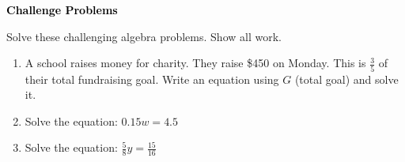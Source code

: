\documentclass[12pt, letterpaper, fleqn]{article}
\begin{document}
\newpage

\begin{tcolorbox}[colback=black!10]
\large\textcolor{black}{\textbf{Challenge Problems}}
\end{tcolorbox}

\noindent
Solve these challenging algebra problems. Show all work.

\vspace{3mm}

\begin{enumerate}[itemsep=2.4cm, leftmargin=0.6cm]

\item A school raises money for charity. They raise \$450 on Monday. This is $\frac{3}{5}$ of their total fundraising goal. Write an equation using $G$ (total goal) and solve it.

\vspace{2.3cm}

\item Solve the equation: $0.15w = 4.5$

\vspace{2.3cm}

\item Solve the equation: $\frac{5}{8}y = \frac{15}{16}$

\vspace{2.5cm}

\end{enumerate}
\end{document}

